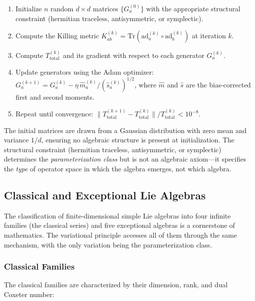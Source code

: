 \begin{enumerate}[label=\arabic*.]
\item Initialize $n$ random $d \times d$ matrices $\{G_a^{(0)}\}$ with the appropriate structural constraint (hermitian traceless, antisymmetric, or symplectic).

\item Compute the Killing metric $K_{ab}^{(k)} = \mathrm{Tr}(\mathrm{ad}_a^{(k)} \circ \mathrm{ad}_b^{(k)})$ at iteration $k$.

\item Compute $T_{\mathrm{total}}^{(k)}$ and its gradient with respect to each generator $G_a^{(k)}$.

\item Update generators using the Adam optimizer: $G_a^{(k+1)} = G_a^{(k)} - \eta\, \hat{m}_a^{(k)} / (\hat{s}_a^{(k)})^{1/2}$, where $\hat{m}$ and $\hat{s}$ are the bias-corrected first and second moments.

\item Repeat until convergence: $\|T_{\mathrm{total}}^{(k+1)} - T_{\mathrm{total}}^{(k)}\| / T_{\mathrm{total}}^{(k)} < 10^{-8}$.
\end{enumerate}

The initial matrices are drawn from a Gaussian distribution with zero mean and variance $1/d$, ensuring no algebraic structure is present at initialization. The structural constraint (hermitian traceless, antisymmetric, or symplectic) determines the \textit{parameterization class} but is not an algebraic axiom---it specifies the \textit{type} of operator space in which the algebra emerges, not which algebra.

\subsection{Classical and Exceptional Lie Algebras}\label{sec:algebra_classification}

The classification of finite-dimensional simple Lie algebras into four infinite families (the classical series) and five exceptional algebras is a cornerstone of mathematics. The variational principle accesses all of them through the same mechanism, with the only variation being the parameterization class.

\subsubsection{Classical Families}

The classical families are characterized by their dimension, rank, and dual Coxeter number:

